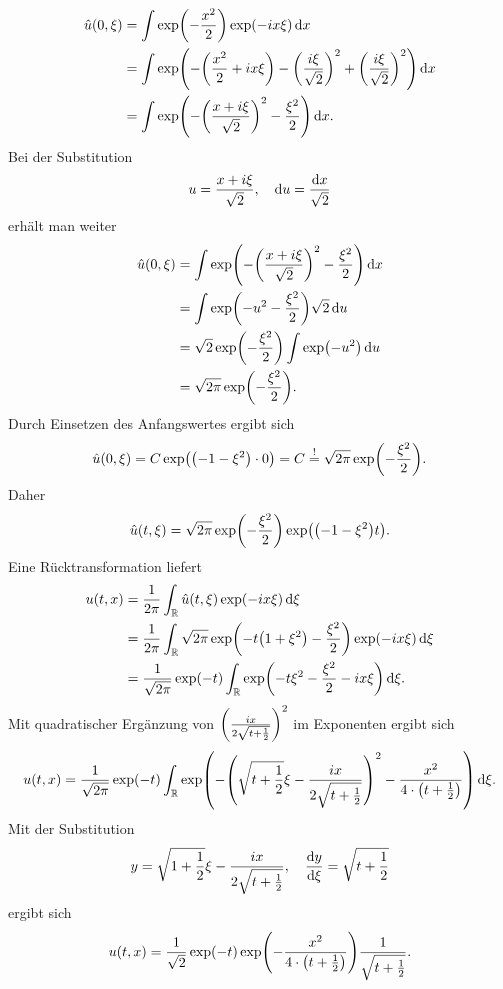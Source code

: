 \documentclass{exercise}
\begin{document}
\begin{enumerate}
        \begin{align*}
            \hat{u}\parentheses*{0, \xi} &= \int\exp\parentheses*{-\frac{x^2}{2}}\exp\parentheses*{-ix\xi}\d x\\
            &= \int\exp\parentheses*{-\parentheses*{\frac{x^2}{2} + ix\xi} - \parentheses*{\frac{i\xi}{\sqrt{2}}}^2 + \parentheses*{\frac{i\xi}{\sqrt{2}}}^2}\d x\\
            &= \int\exp\parentheses*{-\parentheses*{\frac{x + i\xi}{\sqrt{2}}}^2 - \frac{\xi^2}{2}}\d x.
        \end{align*}
        Bei der Substitution
        \[
            u = \frac{x + i\xi}{\sqrt{2}}, \quad \d u = \frac{\d x}{\sqrt{2}}
        \]
        erhält man weiter
        \begin{align*}
            \hat{u}\parentheses*{0, \xi} &= \int\exp\parentheses*{-\parentheses*{\frac{x + i\xi}{\sqrt{2}}}^2 - \frac{\xi^2}{2}}\d x\\
            &= \int\exp\parentheses*{-u^2 - \frac{\xi^2}{2}}\sqrt{2}\d u\\
            &= \sqrt{2}\exp\parentheses*{-\frac{\xi^2}{2}}\int\exp\parentheses*{-u^2}\d u\\
            &= \sqrt{2\pi}\exp\parentheses*{-\frac{\xi^2}{2}}.
        \end{align*}
        Durch Einsetzen des Anfangswertes ergibt sich
        \[
            \hat{u}\parentheses*{0, \xi} = C\exp\parentheses*{\parentheses*{-1 - \xi^2} \cdot 0} = C \stackrel{!}{=} \sqrt{2\pi}\exp\parentheses*{-\frac{\xi^2}{2}}.
        \]
        Daher
        \[
            \hat{u}\parentheses*{t, \xi} = \sqrt{2\pi}\exp\parentheses*{-\frac{\xi^2}{2}}\exp\parentheses*{\parentheses*{-1 - \xi^2}t}.
        \]
        Eine Rücktransformation liefert
        \begin{align*}
            u\parentheses*{t, x} &= \frac{1}{2\pi}\int_\R \hat{u}\parentheses*{t, \xi}\exp\parentheses*{-ix\xi}\d\xi\\
            &= \frac{1}{2\pi}\int_\R \sqrt{2\pi}\exp\parentheses*{-t\parentheses*{1 + \xi^2} - \frac{\xi^2}{2}}\exp\parentheses*{-ix\xi}\d\xi\\
            &= \frac{1}{\sqrt{2\pi}}\exp\parentheses*{-t}\int_\R \exp\parentheses*{-t\xi^2 - \frac{\xi^2}{2} - ix\xi}\d\xi.
        \end{align*}
        Mit quadratischer Ergänzung von \(\parentheses*{\frac{ix}{2\sqrt{t + \frac{1}{2}}}}^2\) im Exponenten ergibt sich
        \[
            u\parentheses*{t, x} = \frac{1}{\sqrt{2\pi}}\exp\parentheses*{-t}\int_\R \exp\parentheses*{-\parentheses*{\sqrt{t + \frac{1}{2}}\xi - \frac{ix}{2\sqrt{t + \frac{1}{2}}}}^2 - \frac{x^2}{4 \cdot \parentheses*{t + \frac{1}{2}}}}\d\xi.
        \]
        Mit der Substitution
        \[
            y = \sqrt{1 + \frac{1}{2}}\xi - \frac{ix}{2\sqrt{t + \frac{1}{2}}}, \quad \frac{\d y}{\d\xi} = \sqrt{t + \frac{1}{2}}
        \]
        ergibt sich
        \[
            u\parentheses*{t, x} = \frac{1}{\sqrt{2}}\exp\parentheses*{-t}\exp\parentheses*{-\frac{x^2}{4 \cdot \parentheses*{t + \frac{1}{2}}}}\frac{1}{\sqrt{t + \frac{1}{2}}}.
        \]
    \end{enumerate}
\end{document}
